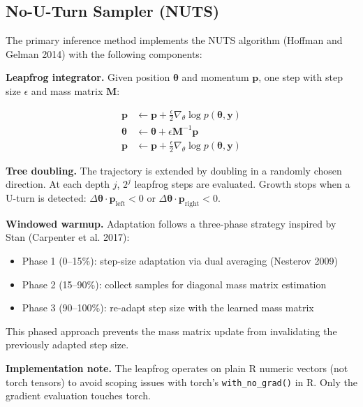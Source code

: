 \documentclass[
  11pt,
]{article}
\providecommand{\tightlist}{%
  \setlength{\itemsep}{0pt}\setlength{\parskip}{0pt}}
\begin{document}
\subsection{No-U-Turn Sampler (NUTS)}\label{no-u-turn-sampler-nuts}

The primary inference method implements the NUTS algorithm (Hoffman and
Gelman 2014) with the following components:

\textbf{Leapfrog integrator.} Given position \(\boldsymbol\theta\) and
momentum \(\mathbf{p}\), one step with step size \(\epsilon\) and mass
matrix \(\mathbf{M}\):

\begin{align}
\mathbf{p} &\leftarrow \mathbf{p} + \frac{\epsilon}{2} \nabla_\theta \log p(\boldsymbol\theta, \mathbf{y}) \\
\boldsymbol\theta &\leftarrow \boldsymbol\theta + \epsilon \mathbf{M}^{-1} \mathbf{p} \\
\mathbf{p} &\leftarrow \mathbf{p} + \frac{\epsilon}{2} \nabla_\theta \log p(\boldsymbol\theta, \mathbf{y})
\end{align}

\textbf{Tree doubling.} The trajectory is extended by doubling in a
randomly chosen direction. At each depth \(j\), \(2^j\) leapfrog steps
are evaluated. Growth stops when a U-turn is detected:
\(\Delta\boldsymbol\theta \cdot \mathbf{p}_{\text{left}} < 0\) or
\(\Delta\boldsymbol\theta \cdot \mathbf{p}_{\text{right}} < 0\).

\textbf{Windowed warmup.} Adaptation follows a three-phase strategy
inspired by Stan (Carpenter et al. 2017):

\begin{itemize}
\tightlist
\item
  Phase 1 (0--15\%): step-size adaptation via dual averaging (Nesterov
  2009)
\item
  Phase 2 (15--90\%): collect samples for diagonal mass matrix
  estimation
\item
  Phase 3 (90--100\%): re-adapt step size with the learned mass matrix
\end{itemize}

This phased approach prevents the mass matrix update from invalidating
the previously adapted step size.

\textbf{Implementation note.} The leapfrog operates on plain R numeric
vectors (not torch tensors) to avoid scoping issues with torch's
\texttt{with\_no\_grad()} in R. Only the gradient evaluation touches
torch.
\end{document}
